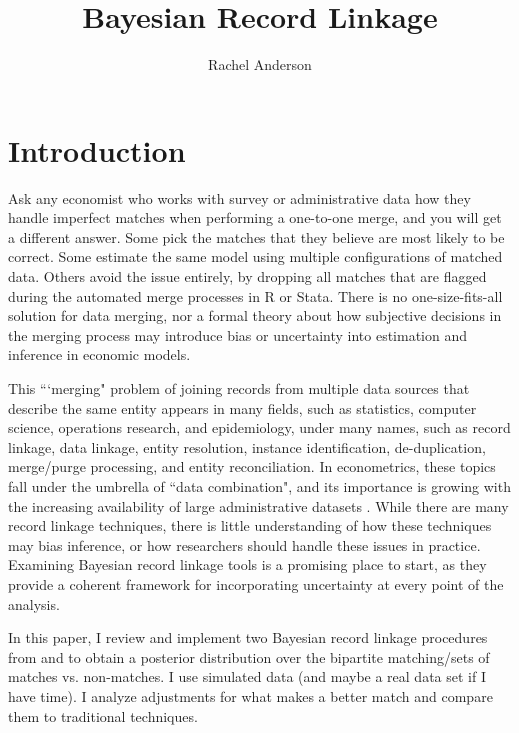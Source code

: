 \documentclass[11pt,reqno]{amsart}
\title{Bayesian Record Linkage}
\author{Rachel Anderson}
\begin{document}
\vspace*{-1cm}
\maketitle


\section{Introduction}

Ask any economist who works with survey or administrative data how they handle imperfect matches when performing a one-to-one merge, and you will get a different answer.  Some pick the matches that they believe are most likely to be correct.  Some estimate the same model using multiple configurations of matched data.  Others avoid the issue entirely, by dropping all matches that are flagged during the automated merge processes in R or Stata.  There is no one-size-fits-all solution for data merging, nor a formal theory about how subjective decisions in the merging process may introduce bias or uncertainty into estimation and inference in economic models. 

This ```merging" problem of joining records from multiple data sources that describe the same entity appears in many fields, such as statistics, computer science, operations research, and epidemiology, under many names, such as record linkage, data linkage, entity resolution, instance identification, de-duplication, merge/purge processing, and entity reconciliation.    In econometrics, these topics fall under the umbrella of ``data combination", and its importance is growing with the increasing availability of large administrative datasets \citep{ridder_moffitt_2007}.  While there are many record linkage techniques, there is little understanding of how these techniques may bias inference, or how researchers should handle these issues in practice.  Examining Bayesian record linkage tools is a promising place to start, as they provide a coherent framework for incorporating uncertainty at every point of the analysis.  

In this paper, I review and implement two Bayesian record linkage procedures from \cite{larsen_rubin_2001} and \cite{sadinle_2017} to obtain a posterior distribution over the bipartite matching/sets of matches vs. non-matches. I use simulated data (and maybe a real data set if I have time).  I analyze adjustments for what makes a better match and compare them to traditional techniques.
\end{document}
